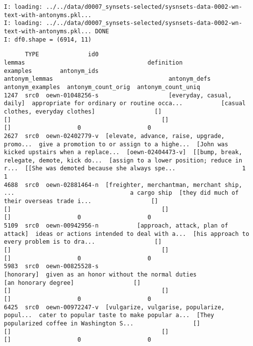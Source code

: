 \documentclass[a4paper,10pt,onecolumn,oneside,openright]{article}
\begin{document}
\begin{verbatim}
I: loading: ../../data/d0007_synsets-selected/sysnsets-data-0002-wn-text-with-antonyms.pkl...
I: loading: ../../data/d0007_synsets-selected/sysnsets-data-0002-wn-text-with-antonyms.pkl... DONE
I: df0.shape = (6914, 11)
\end{verbatim}
\begin{verbatim}
      TYPE              id0                                       lemmas                                   definition                                     examples        antonym_ids                               antonym_lemmas                                 antonym_defs                             antonym_examples  antonym_count_orig  antonym_count_uniq
1247  src0  oewn-01048256-s                    [everyday, casual, daily]  appropriate for ordinary or routine occa...           [casual clothes, everyday clothes]                 []                                           []                                           []                                           []                   0                   0
2627  src0  oewn-02402779-v  [elevate, advance, raise, upgrade, promo...  give a promotion to or assign to a highe...  [John was kicked upstairs when a replace...  [oewn-02404473-v]  [[bump, break, relegate, demote, kick do...  [assign to a lower position; reduce in r...  [[She was demoted because she always spe...                   1                   1
4688  src0  oewn-02881464-n  [freighter, merchantman, merchant ship, ...                                 a cargo ship  [they did much of their overseas trade i...                 []                                           []                                           []                                           []                   0                   0
5109  src0  oewn-00942956-n           [approach, attack, plan of attack]  ideas or actions intended to deal with a...  [his approach to every problem is to dra...                 []                                           []                                           []                                           []                   0                   0
5983  src0  oewn-00825528-s                                   [honorary]  given as an honor without the normal duties                         [an honorary degree]                 []                                           []                                           []                                           []                   0                   0
6425  src0  oewn-00972247-v  [vulgarize, vulgarise, popularize, popul...  cater to popular taste to make popular a...  [They popularized coffee in Washington S...                 []                                           []                                           []                                           []                   0                   0

\end{verbatim}
\end{document}
